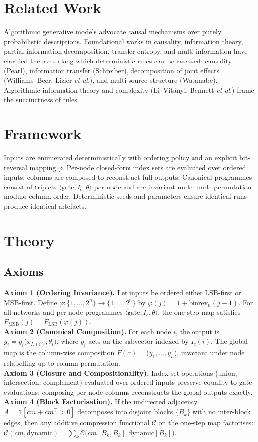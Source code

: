 \documentclass[11pt]{article}
\begin{document}
\section{Related Work}
Algorithmic generative models advocate causal mechanisms over purely probabilistic descriptions. Foundational works in causality, information theory, partial information decomposition, transfer entropy, and multi-information have clarified the axes along which deterministic rules can be assessed: causality (Pearl), information transfer (Schreiber), decomposition of joint effects (Williams--Beer; Lizier \emph{et al}.), and multi-source structure (Watanabe). Algorithmic information theory and complexity (Li--Vit\'anyi; Bennett \emph{et al}.) frame the succinctness of rules.

\section{Framework}
Inputs are enumerated deterministically with ordering policy and an explicit bit-reversal mapping $\varphi$. Per-node closed-form index sets are evaluated over ordered inputs; columns are composed to reconstruct full outputs. Canonical programmes consist of triplets $\langle\text{gate}, I_c, \theta\rangle$ per node and are invariant under node permutation modulo column order. Deterministic seeds and parameters ensure identical runs produce identical artefacts.

\section{Theory}
\subsection{Axioms}
\textbf{Axiom 1 (Ordering Invariance).} Let inputs be ordered either LSB-first or MSB-first. Define $\varphi:\{1,\dots,2^n\}\to\{1,\dots,2^n\}$ by $\varphi(j)=1+\mathrm{binrev}_n(j-1)$. For all networks and per-node programmes $\langle\text{gate}, I_c, \theta\rangle$, the one-step map satisfies $F_{\mathrm{MSB}}(j)=F_{\mathrm{LSB}}(\varphi(j))$.\\
\textbf{Axiom 2 (Canonical Composition).} For each node $i$, the output is $y_i=g_i\big(x_{I_c(i)};\theta_i\big)$, where $g_i$ acts on the subvector indexed by $I_c(i)$. The global map is the column-wise composition $F(x)=\big(y_1,\dots,y_n\big)$, invariant under node relabelling up to column permutation.\\
\textbf{Axiom 3 (Closure and Compositionality).} Index-set operations (union, intersection, complement) evaluated over ordered inputs preserve equality to gate evaluations; composing per-node columns reconstructs the global outputs exactly.\\
\textbf{Axiom 4 (Block Factorisation).} If the undirected adjacency $A=\mathbb{1}[cm+cm^\top>0]$ decomposes into disjoint blocks $\{B_k\}$ with no inter-block edges, then any additive compression functional $\mathcal{C}$ on the one-step map factorises: $\mathcal{C}(cm,\mathrm{dynamic})=\sum_k \mathcal{C}\big(cm[B_k,B_k],\mathrm{dynamic}[B_k]\big)$.
\end{document}
